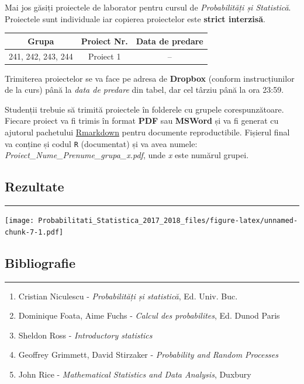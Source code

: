 \documentclass[]{article}
\providecommand{\tightlist}{%
  \setlength{\itemsep}{0pt}\setlength{\parskip}{0pt}}
\begin{document}
Mai jos găsiți proiectele de laborator pentru cursul de
\emph{Probabilități și Statistică}. Proiectele sunt individuale iar
copierea proiectelor este \textbf{strict interzisă}.

\begin{longtable}[]{@{}ccc@{}}
\toprule
Grupa & Proiect Nr. & Data de predare\tabularnewline
\midrule
\endhead
241, 242, 243, 244 & Proiect 1 & --\tabularnewline
\bottomrule
\end{longtable}

Trimiterea proiectelor se va face pe adresa de \textbf{Dropbox} (conform
instrucțiunilor de la curs) până la \emph{data de predare} din tabel,
dar cel târziu până la ora 23:59.

Studenții trebuie să trimită proiectele în folderele cu grupele
corespunzătoare. Fiecare proiect va fi trimis în format \textbf{PDF} sau
\textbf{MSWord} și va fi generat cu ajutorul pachetului
\href{http://rmarkdown.rstudio.com/index.html}{Rmarkdown} pentru
documente reproductibile. Fișierul final va conține și codul \texttt{R}
(documentat) și va avea numele:
\emph{Proiect\_Nume\_Prenume\_grupa\_x.pdf}, unde \emph{x} este numărul
grupei.

\subsection{Rezultate}\label{rezultate}

\begin{center}\rule{0.5\linewidth}{\linethickness}\end{center}

\texttt{[image: Probabilitati\_Statistica\_2017\_2018\_files/figure-latex/unnamed-chunk-7-1.pdf]}

\subsection{Bibliografie}\label{bibliografie}

\begin{center}\rule{0.5\linewidth}{\linethickness}\end{center}

\begin{enumerate}
\def\labelenumi{\arabic{enumi}.}
\tightlist
\item
  Cristian Niculescu - \emph{Probabilități și statistică}, Ed. Univ.
  Buc.
\item
  Dominique Foata, Aime Fuchs - \emph{Calcul des probabilites}, Ed.
  Dunod Paris
\item
  Sheldon Ross - \emph{Introductory statistics}
\item
  Geoffrey Grimmett, David Stirzaker - \emph{Probability and Random
  Processes}
\item
  John Rice - \emph{Mathematical Statistics and Data Analysis}, Duxbury
\end{enumerate}
\end{document}
